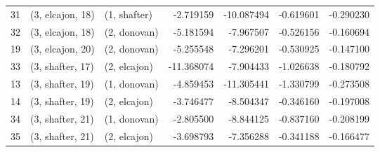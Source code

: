 \begin{tabular}{lllrrrr}
31 &  (3, elcajon, 18) &     (1, shafter) &  -2.719159 & -10.087494 &  -0.619601 & -0.290230 \\
32 &  (3, elcajon, 18) &     (2, donovan) &  -5.181594 &  -7.967507 &  -0.526156 & -0.160694 \\
19 &  (3, elcajon, 20) &     (2, donovan) &  -5.255548 &  -7.296201 &  -0.530925 & -0.147100 \\
33 &  (3, shafter, 17) &     (2, elcajon) & -11.368074 &  -7.904433 &  -1.026638 & -0.180792 \\
13 &  (3, shafter, 19) &     (1, donovan) &  -4.859453 & -11.305441 &  -1.330799 & -0.273508 \\
14 &  (3, shafter, 19) &     (2, elcajon) &  -3.746477 &  -8.504347 &  -0.346160 & -0.197008 \\
34 &  (3, shafter, 21) &     (1, donovan) &  -2.805500 &  -8.844125 &  -0.837160 & -0.208199 \\
35 &  (3, shafter, 21) &     (2, elcajon) &  -3.698793 &  -7.356288 &  -0.341188 & -0.166477 \\
\bottomrule
\end{tabular}
